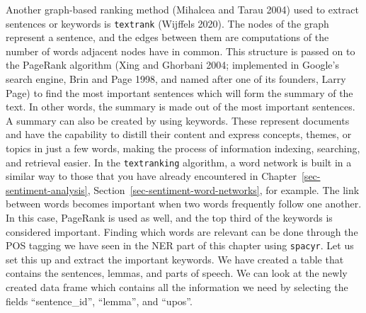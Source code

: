 Another graph-based ranking method (Mihalcea and Tarau 2004) used to extract
sentences or keywords is \texttt{textrank} (Wijffels 2020). The nodes of
the graph represent a sentence, and the edges between them are
computations of the number of words adjacent nodes have in common. This
structure is passed on to the PageRank algorithm (Xing and Ghorbani
2004; implemented in Google's search engine, Brin and Page 1998, and
named after one of its founders, Larry Page) to find the most important
sentences which will form the summary of the text. In other words, the
summary is made out of the most important sentences. A summary can also be
created by using keywords. These represent documents and have the
capability to distill their content and express concepts, themes, or
topics in just a few words, making the process of information indexing,
searching, and retrieval easier. In the \texttt{textranking} algorithm, a
word network is built in a similar way to those that you have already encountered in
Chapter~\ref{sec-sentiment-analysis},
Section~\ref{sec-sentiment-word-networks}, for example. The link between
words becomes important when two words frequently follow one another.
In this case, PageRank is used as well, and the top third of
the keywords is considered important. Finding which words are
relevant can be done through the POS tagging we have seen in the
NER part of this chapter using \texttt{spacyr}. Let us set this up
and extract the important keywords. We have created a table that contains the
sentences, lemmas, and parts of speech. We can look at the newly created
data frame which contains all the information we need by selecting the fields ``sentence\_id'', ``lemma'', and ``upos''.

